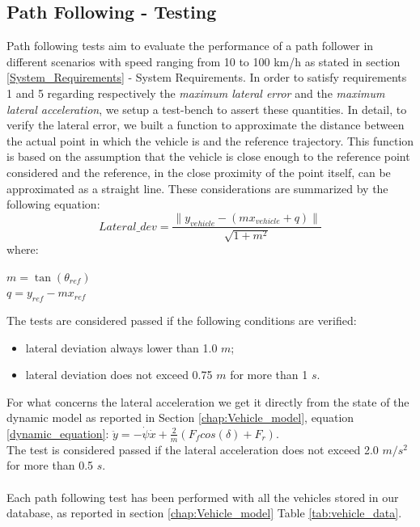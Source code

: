 \subsection{Path Following - Testing}
Path following tests aim to evaluate the performance of a path follower in different scenarios with speed ranging from 10 to 100 km/h as stated in section \ref{System_Requirements} - System Requirements.
In order to satisfy requirements 1 and 5 regarding respectively the \textit{maximum lateral error} and the \textit{maximum lateral acceleration}, we setup a test-bench to assert these quantities. In detail, to verify the lateral error, we built a function to approximate the distance between the actual point in which the vehicle is and the reference trajectory. This function is based on the assumption that the vehicle is close enough to the reference point considered and the reference, in the close proximity of the point itself, can be approximated as a straight line. These considerations are summarized by the following equation:
\begin{equation}
    Lateral\_dev = \frac{\|y_{vehicle} - (mx_{vehicle} + q)\|}{\sqrt{1 + m^2}} \label{eq:lateral_dev}
\end{equation}
where:\\
\begin{center}
 $   m = \tan(\theta_{ref}) $\\ 
 $  q = y_{ref}-mx_{ref}$
\end{center}
\vspace{10pt}
The tests are considered passed if the following conditions are verified:
\begin{itemize}
    \item lateral deviation always lower than 1.0 $m$;
    \item lateral deviation does not exceed 0.75 $m$ for more than 1 $s$.
\end{itemize}
\vspace{10pt}
For what concerns the lateral acceleration we get it directly from the state of the dynamic model as reported in Section \ref{chap:Vehicle_model}, equation \ref{dynamic_equation}: $\ddot{y} = -\dot{\psi}\dot{x} + \frac{2}{m}\left(F_fcos(\delta) + F_r\right)$.\\
The test is considered passed if the lateral acceleration does not exceed 2.0 $m/s^2$ for more than 0.5 $s$.\\ \\
Each path following test has been performed with all the vehicles stored in our database, as reported in section \ref{chap:Vehicle_model} Table \ref{tab:vehicle_data}.

